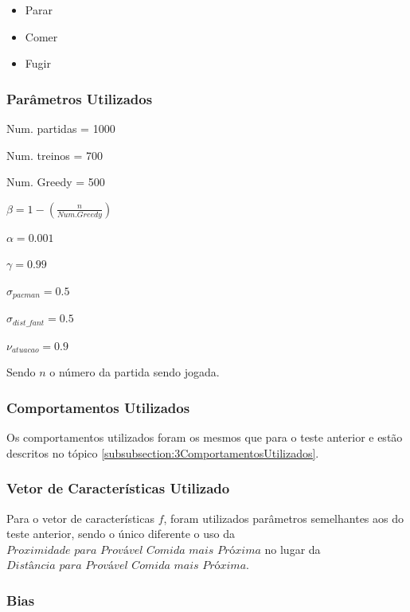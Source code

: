 \begin{itemize}
	\item Parar
	\item Comer
	\item Fugir
\end{itemize}

\subsubsection{Parâmetros Utilizados}

\begin{multicols}{2}

Num. partidas = 1000

Num. treinos = 700

Num. Greedy = 500

$ \beta = 1 - \left( \frac{n}{Num. Greedy} \right) $

$ \alpha = 0.001 $

$ \gamma = 0.99 $

$ \sigma_{pacman} = 0.5 $

$ \sigma_{dist\_fant} = 0.5 $

$ \nu_{atuacao} = 0.9 $

\end{multicols}

Sendo $ n $ o número da partida sendo jogada.

\subsubsection{Comportamentos Utilizados}

Os comportamentos utilizados foram os mesmos que para o teste anterior e estão descritos no tópico \ref{subsubsection:3ComportamentosUtilizados}.

\subsubsection{Vetor de Características Utilizado}

Para o vetor de características $ f $, foram utilizados parâmetros semelhantes aos do teste anterior, sendo o único diferente o uso da $ \textit{Proximidade para Provável Comida mais Próxima} $ no lugar da $ \textit{Distância para Provável Comida mais Próxima} $.

\subsubsection*{Bias}

